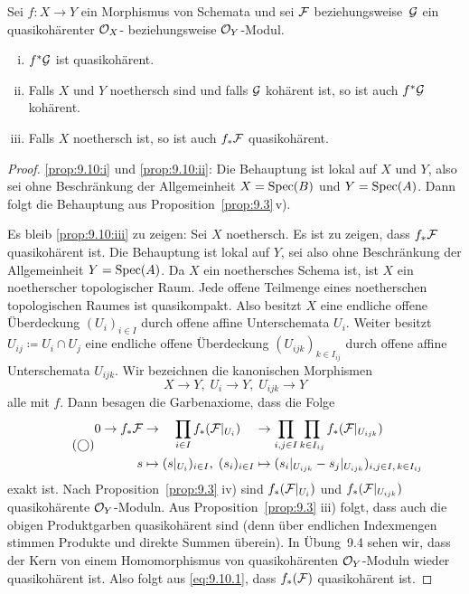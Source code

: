 \begin{prop}
\label{prop:9.10}
	Sei $f\colon X \to Y$ ein Morphismus von Schemata und sei $\mathcal{F}$ beziehungsweise~$\mathcal{G}$ ein quasikohärenter $\mathcal{O}_X$- beziehungsweise $\mathcal{O}_Y$-Modul.
	\begin{enumerate}[i)]
		\item\label{prop:9.10:i}   $f^*\mathcal{G}$ ist quasikohärent.
		\item\label{prop:9.10:ii}  Falls $X$ und $Y$ noethersch sind und falls $\mathcal{G}$ kohärent ist, so ist auch $f^*\mathcal{G}$ kohärent.
		\item\label{prop:9.10:iii} Falls $X$ noethersch ist, so ist auch $f_*\mathcal{F}$ quasikohärent.
	\end{enumerate}
	\begin{proof} \ref{prop:9.10:i} und \ref{prop:9.10:ii}: Die Behauptung ist lokal auf $X$ und $Y$, also sei ohne Beschränkung der Allgemeinheit $X=\operatorname{Spec}(B)$ und $Y=\operatorname{Spec}(A)$. Dann folgt die Behauptung aus Proposition~\ref{prop:9.3}\,v).
		
		Es bleib \ref{prop:9.10:iii} zu zeigen: Sei $X$ noethersch. Es ist zu zeigen, dass $f_*\mathcal{F}$ quasikohärent ist. Die Behauptung ist lokal auf $Y$, sei also ohne Beschränkung der Allgemeinheit $Y=\operatorname{Spec}(A)$. Da $X$ ein noethersches Schema ist, ist $X$ ein noetherscher topologischer Raum. Jede offene Teilmenge eines noetherschen topologischen Raumes ist quasikompakt. Also besitzt $X$ eine endliche offene Überdeckung $(U_i)_{i\in I}$ durch offene affine Unterschemata $U_i$. Weiter besitzt $U_{ij}\coloneqq U_i \cap U_j$ eine endliche offene Überdeckung $(U_{ijk})_{k\in I_{ij}}$ durch offene affine Unterschemata $U_{ijk}$. Wir bezeichnen die kanonischen Morphismen
			\[
			 	X \to Y,\; U_i\to Y,\;U_{ijk}\to Y
			\]
			alle mit $f$. Dann besagen die Garbenaxiome, dass die Folge
			\begin{equation*}
			\label{eq:9.10.1}\tag{$\bigcirc$}
				\begin{alignedat}{3}
					0 \to f_*\mathcal{F} &\to \quad\prod_{i\in I}f_*(\mathcal{F}\vert_{U_i}) &&\to \prod_{i,j\in I}\prod_{k \in I_{ij}}f_*(\mathcal{F}\vert_{U_{ijk}})\\
					s &\mapsto (s\vert_{U_i})_{i\in I},\; (s_i)_{i\in I} &&\mapsto (s_i\vert_{U_{ijk}}-s_j\vert_{U_{ijk}})_{i,j\in I,\, k \in I_{ij}}
				\end{alignedat}
			\end{equation*}
			exakt ist. Nach Proposition~\ref{prop:9.3} iv) sind $f_*(\mathcal{F}\vert_{U_i})$ und $f_*(\mathcal{F}\vert_{U_{ijk}})$ quasikohärente $\mathcal{O}_Y$-Moduln. Aus Proposition~\ref{prop:9.3} iii) folgt, dass auch die obigen Produktgarben quasikohärent sind (denn über endlichen Indexmengen stimmen Produkte und direkte Summen überein). In Übung~9.4 sehen wir, dass der Kern von einem Homomorphismus von quasikohärenten $\mathcal{O}_Y$-Moduln wieder quasikohärent ist. Also folgt aus \eqref{eq:9.10.1}, dass $f_*(\mathcal{F})$ quasikohärent ist.
	\end{proof}
\end{prop}

